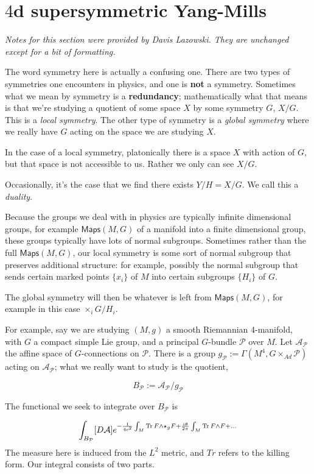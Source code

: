 \documentclass[leqno, openany]{memoir}
\theoremstyle{definition}
\theoremstyle{remark}
\theoremstyle{plain}
\theoremstyle{definition}
\theoremstyle{remark}
\newcommand{\ms}[1]{\mathsf{#1}}
\begin{document}
\section{$4$d supersymmetric Yang-Mills}
\textit{Notes for this section were provided by Davis Lazowski. They are unchanged except for a bit of formatting.}

The word symmetry here is actually a confusing one. There are two types of symmetries one encounters in physics, and one is \textbf{not} a symmetry. Sometimes what we mean by symmetry is a \textbf{redundancy}; mathematically what that means is that we're studying a quotient of some space $X$ by some symmetry $G$, $X/G$. This is a \textit{local symmetry}. The other type of symmetry is a \textit{global symmetry} where we really have $G$ acting on the space we are studying $X$.

In the case of a local symmetry, platonically there is a space $X$ with action of $G$, but that space is not accessible to us. Rather we only can see $X/G$.

Occasionally, it's the case that we find there exists $Y/H = X/G$. We call this a \textit{duality}.

Because the groups we deal with in physics are typically infinite dimensional groups, for example $\ms{Maps}(M,G)$ of a manifold into a finite dimensional group, these groups typically have lots of normal subgroups.  Sometimes rather than the full $\ms{ Maps }(M,G)$, our local symmetry is some sort of normal subgroup that preserves additional structure: for example, possibly the normal subgroup that sends certain marked points $\{x_{i}\}$ of $M$ into certain subgroups $\{H_{i}\}$ of $G$.

The global symmetry will then be whatever is left from $\ms{Maps}(M,G)$, for example in this case $\times_{i} G/H_{i}$.

For example, say we are studying $(M,g)$ a smooth Riemannian 4-manifold, with $G$ a compact simple Lie group, and a principal $G$-bundle $\mathcal{P}$ over $M$. Let $\mathcal{A}_{\mathcal{P}}$ the affine space of $G$-connections on $\mathcal{P}$.  There is a group $g_{\mathcal{P}} := \Gamma(M^{4},G \times_{Ad} \mathcal{P})$ acting on $\mathcal{A}_{\mathcal{P}}$; what we really want to study is the quotient,

\[
B_{\mathcal{P}} := \mathcal{A}_{\mathcal{P}}/g_{\mathcal{P}}
\]

The functional we seek to integrate over $B_{\mathcal{P}}$ is

\[
\int_{B_{\mathcal{P}}} [D\mathcal{A}] e^{-\frac{1}{4c^{2}} \int_{M} \Tr F \wedge \star_{g} F +  \frac{i \theta}{2\pi} \int_{M} \Tr F \wedge F + \dots}
\]
The measure here is induced from the $L^{2}$ metric, and $Tr$ refers to the killing form. Our integral consists of two parts.
\end{document}
